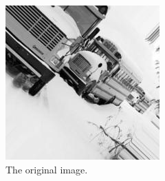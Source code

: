 \begin{figure}
    \centering
    \begin{subfigure}{0.3\textwidth}
        \centering
        \includegraphics[width=\textwidth]{images/stripes/original.jpg}
        \caption{The original image.}
        \label{subfig:stripes_original}
    \end{subfigure}
    \hfill
    \begin{subfigure}{0.3\textwidth}
        \centering

\end{subfigure}
\end{figure}
